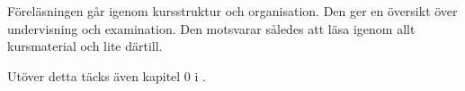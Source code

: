Föreläsningen går igenom kursstruktur och organisation.
Den ger en översikt över undervisning och examination.
Den motsvarar således att läsa igenom allt kursmaterial och lite därtill.

Utöver detta täcks även kapitel 0 i  
\cite{Brookshear2012csa}.
